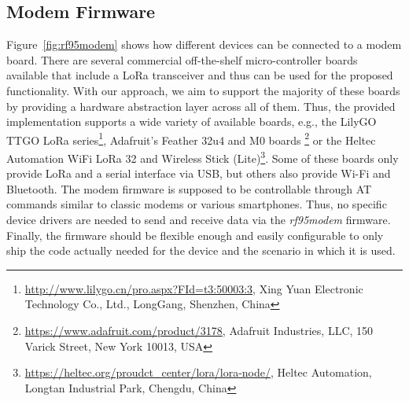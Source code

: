 \subsection{Modem Firmware}
Figure~\ref{fig:rf95modem} shows how different devices can be connected to a modem board. 
There are several commercial off-the-shelf micro-controller boards available that include a LoRa transceiver and thus can be used for the proposed functionality.
With our approach, we aim to support the majority of these boards by providing a hardware abstraction layer across all of them.
Thus, the provided implementation supports a wide variety of available boards, e.g., 
the LilyGO TTGO LoRa series\footnote{\url{http://www.lilygo.cn/pro.aspx?FId=t3:50003:3}, Xing Yuan Electronic Technology Co., Ltd., LongGang, Shenzhen, China},
Adafruit's Feather 32u4 and M0 boards \footnote{\url{https://www.adafruit.com/product/3178}, Adafruit Industries, LLC, 150 Varick Street, New York 10013, USA} or 
the Heltec Automation WiFi LoRa 32 and Wireless Stick (Lite)\footnote{\url{https://heltec.org/proudct_center/lora/lora-node/}, Heltec Automation, Longtan Industrial Park, Chengdu, China}.
Some of these boards only provide LoRa and a serial interface via USB, but others also provide Wi-Fi and Bluetooth.
The modem firmware is supposed to be controllable through AT commands similar to classic modems or various smartphones. 
Thus, no specific device drivers are needed to send and receive data via the \textit{rf95modem} firmware.
Finally, the firmware should be flexible enough and easily configurable to only ship the code actually needed for the device and the scenario in which it is used.


